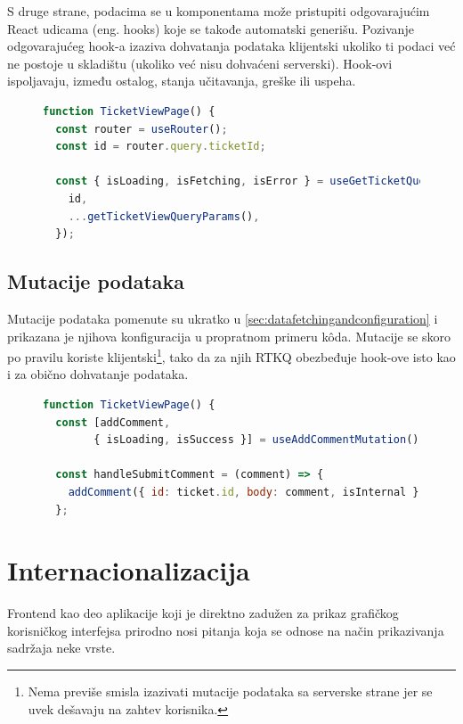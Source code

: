 \documentclass[12pt,oneside]{memoir}
\begin{document}
S druge strane, podacima se u komponentama može pristupiti odgovarajućim React udicama (eng. hooks) \cite{reactdocshooks}  koje se takođe automatski generišu. Pozivanje odgovarajućeg hook-a izaziva dohvatanja podataka klijentski ukoliko ti podaci već ne postoje u skladištu (ukoliko već nisu dohvaćeni serverski). Hook-ovi ispoljavaju, između ostalog, stanja učitavanja, greške ili uspeha.

\begin{figure}[h]
\begin{lstlisting}[language=JavaScript, style=ES6, caption={Korišćenje RTKQ hook-ova.}]
function TicketViewPage() {
  const router = useRouter();
  const id = router.query.ticketId;

  const { isLoading, isFetching, isError } = useGetTicketQuery({
    id,
    ...getTicketViewQueryParams(),
  });
\end{lstlisting}
\end{figure}

\newpage
\subsection{Mutacije podataka}

Mutacije podataka pomenute su ukratko u \ref{sec:datafetchingandconfiguration} i prikazana je njihova konfiguracija u propratnom primeru k\^{o}da. Mutacije se skoro po pravilu koriste klijentski\footnote{Nema previše smisla izazivati mutacije podataka sa serverske strane jer se uvek dešavaju na zahtev korisnika.}, tako da za njih RTKQ obezbeđuje hook-ove isto kao i za obično dohvatanje podataka.

\begin{figure}[h]
\begin{lstlisting}[language=JavaScript, style=ES6, caption={Korišćenje RTKQ mutacija na primeru dodavanja komentara na tiket.}]
function TicketViewPage() {
  const [addComment,
        { isLoading, isSuccess }] = useAddCommentMutation();

  const handleSubmitComment = (comment) => {
    addComment({ id: ticket.id, body: comment, isInternal });
  };
\end{lstlisting}
\end{figure}


\section{Internacionalizacija}
\label{sec:intl}

Frontend kao deo aplikacije koji je direktno zadužen za prikaz grafičkog korisničkog interfejsa prirodno nosi pitanja koja se odnose na način prikazivanja sadržaja neke vrste. 
\end{document}

